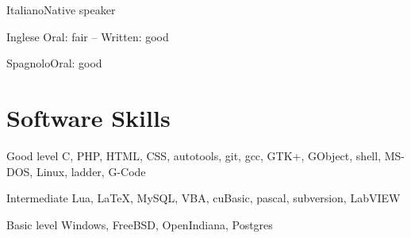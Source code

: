 \documentclass{tccv}
\begin{document}
\begin{minipage}[t]{0.44\linewidth}
\begin{factlist}
\item{Italiano}{Native speaker}
\item{Inglese} {Oral: fair -- Written: good}
\item{Spagnolo}{Oral: good}
\end{factlist}

\section{Software Skills}

\begin{factlist}

\item{Good level}
     {C, PHP, HTML, CSS, autotools, git, gcc, GTK+, GObject, shell,
      MS-DOS, Linux, ladder, G-Code}

\item{Intermediate}
     {Lua, \LaTeX, MySQL, VBA, cuBasic, pascal, subversion, LabVIEW}

\item{Basic level}
     {Windows, FreeBSD, OpenIndiana, Postgres}

\end{factlist}

\end{minipage}
\end{document}
